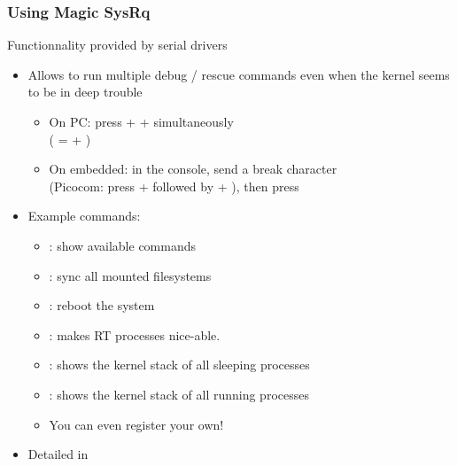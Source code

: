 \begin{frame}[fragile]
  \frametitle{Using Magic SysRq}
  Functionnality provided by serial drivers
  \begin{itemize}
  \item Allows to run multiple debug / rescue commands even when the
    kernel seems to be in deep trouble
    \begin{itemize}
    \item On PC: press \code{[Alt]} +  + 
	  simultaneously\\
          (\code{[SysRq]} = \code{[Alt]} + )
    \item On embedded: in the console, send a break character\\
      (Picocom: press \code{[Ctrl]} +  followed by \code{[Ctrl]}
      + \code{\ }), then press 
    \end{itemize}
  \item Example commands:
    \begin{itemize}
    \item {}: show available commands
    \item {}: sync all mounted filesystems
    \item {}: reboot the system
    \item {}: makes RT processes nice-able.
    \item {}: shows the kernel stack of all sleeping processes
    \item {}: shows the kernel stack of all running processes
    \item You can even register your own!
    \end{itemize}
  \item Detailed in 
  \end{itemize}
\end{frame}



